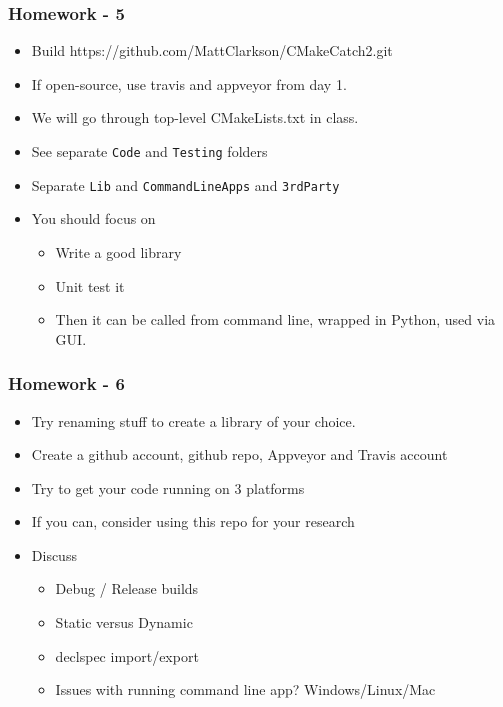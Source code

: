 \subsubsection{Homework - 5}\label{homework---5}

\begin{itemize}
\itemsep1pt\parskip0pt
\item
  Build https://github.com/MattClarkson/CMakeCatch2.git
\item
  If open-source, use travis and appveyor from day 1.
\item
  We will go through top-level CMakeLists.txt in class.
\item
  See separate \texttt{Code} and \texttt{Testing} folders
\item
  Separate \texttt{Lib} and \texttt{CommandLineApps} and
  \texttt{3rdParty}
\item
  You should focus on

  \begin{itemize}
  \itemsep1pt\parskip0pt
  \item
    Write a good library
  \item
    Unit test it
  \item
    Then it can be called from command line, wrapped in Python, used via
    GUI.
  \end{itemize}
\end{itemize}

\subsubsection{Homework - 6}\label{homework---6}

\begin{itemize}
\itemsep1pt\parskip0pt
\item
  Try renaming stuff to create a library of your choice.
\item
  Create a github account, github repo, Appveyor and Travis account
\item
  Try to get your code running on 3 platforms
\item
  If you can, consider using this repo for your research
\item
  Discuss

  \begin{itemize}
  \itemsep1pt\parskip0pt
  \item
    Debug / Release builds
  \item
    Static versus Dynamic
  \item
    declspec import/export
  \item
    Issues with running command line app? Windows/Linux/Mac
  \end{itemize}
\end{itemize}

